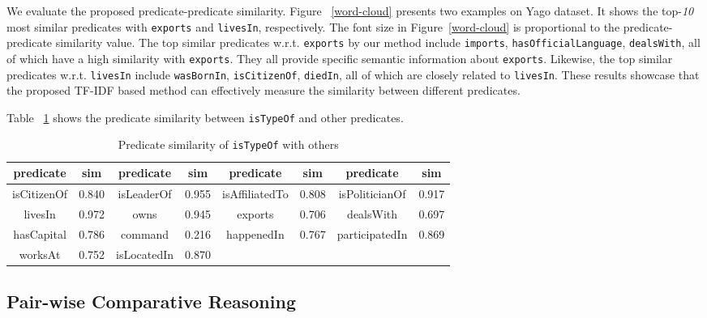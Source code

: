 We evaluate the proposed predicate-predicate similarity. Figure ~\ref{word-cloud} presents two examples on Yago dataset. It shows the top-{\em 10} most similar predicates with {\tt exports} and {\tt livesIn}, respectively. The font size in Figure~\ref{word-cloud} is proportional to the predicate-predicate similarity value.
The top similar predicates w.r.t. {\tt exports} by our method include {\tt imports}, {\tt hasOfficialLanguage}, {\tt dealsWith}, all of which have a high similarity with {\tt exports}. They all provide specific semantic information about {\tt exports}.
Likewise, the top similar predicates w.r.t. {\tt livesIn} include {\tt wasBornIn}, {\tt isCitizenOf}, {\tt diedIn}, all of which are closely related to {\tt livesIn}. %
These results showcase that the proposed TF-IDF based method can effectively measure the similarity between different predicates.

Table ~\ref{appendix-pred-sim} shows the predicate similarity between {\tt isTypeOf} and other predicates. %
\begin{table}[!htbp]
    \centering
    \scriptsize
    \caption{Predicate similarity of {\tt isTypeOf} with others}
    \vspace{-1\baselineskip}
    \begin{tabular}{ |c|c|c|c|c|c|c|c| }
  \hline
  predicate & sim & predicate & sim & predicate & sim & predicate & sim \\
  \hline
 isCitizenOf &  0.840 &  isLeaderOf &  0.955 & isAffiliatedTo &  0.808 &  isPoliticianOf &  0.917 \\
 livesIn &  0.972 &  owns &  0.945 & exports &  0.706 &  dealsWith &  0.697\\
 hasCapital &  0.786 &  command &  0.216 & happenedIn &  0.767 &  participatedIn &  0.869\\
 worksAt &  0.752 &  isLocatedIn &  0.870 & & & &\\
  \hline
\end{tabular}
\label{appendix-pred-sim}
\end{table}


\vspace{-1.0\baselineskip}
\subsection{Pair-wise Comparative Reasoning}\label{exp-pair-section}


